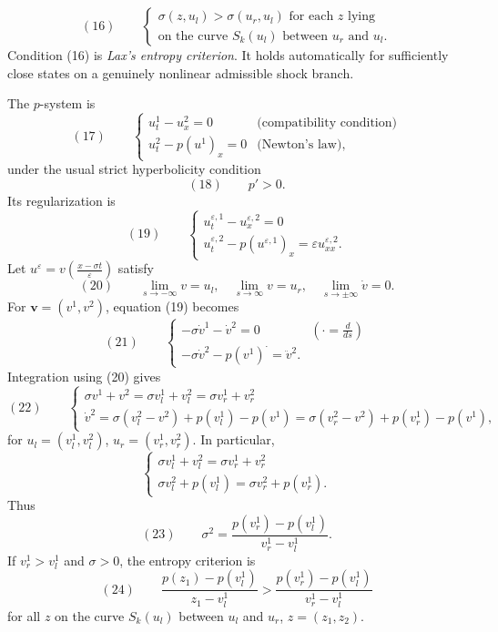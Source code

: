 \begin{definition}
\label{def:lax-entropy-criterion-general}
$$(16) \qquad \begin{cases} \sigma(z,u_l) > \sigma(u_r,u_l) \text{ for each } z \text{ lying} \\ \text{on the curve } S_k(u_l) \text{ between } u_r \text{ and } u_l. \end{cases}$$
Condition (16) is \textit{Lax's entropy criterion}. It holds automatically for sufficiently close states on a genuinely nonlinear admissible shock branch.
\end{definition}

\begin{example}
\label{ex:traveling-waves-p-system}
The $p$-system is
$$(17) \qquad \begin{cases} u^1_t - u^2_x = 0 & \text{(compatibility condition)} \\ u^2_t - p(u^1)_x = 0 & \text{(Newton's law)}, \end{cases}$$
under the usual strict hyperbolicity condition
$$(18) \qquad p' > 0.$$
Its regularization is
$$(19) \qquad \begin{cases} u^{\varepsilon,1}_t - u^{\varepsilon,2}_x = 0 \\ u^{\varepsilon,2}_t - p(u^{\varepsilon,1})_x = \varepsilon u^{\varepsilon,2}_{xx}. \end{cases}$$
Let $u^\varepsilon = v\left(\frac{x-\sigma t}{\varepsilon}\right)$ satisfy
$$(20) \qquad \lim_{s\to-\infty} v = u_l, \quad \lim_{s\to\infty} v = u_r, \quad \lim_{s\to\pm\infty} \dot v = 0.$$
For $\mathbf v=(v^1,v^2)$, equation (19) becomes
$$(21) \qquad \begin{cases} -\sigma\dot v^1 - \dot v^2 = 0 & \left(\cdot = \frac{d}{ds}\right) \\ -\sigma\dot v^2 - p(v^1)^\cdot = \ddot v^2. \end{cases}$$
Integration using (20) gives
$$(22) \qquad \begin{cases} \sigma v^1 + v^2 = \sigma v^1_l + v^2_l = \sigma v^1_r + v^2_r \\ \dot v^2 = \sigma(v^2_l-v^2) + p(v^1_l) - p(v^1) = \sigma(v^2_r-v^2) + p(v^1_r) - p(v^1), \end{cases}$$
for $u_l=(v^1_l,v^2_l)$, $u_r=(v^1_r,v^2_r)$. In particular,
$$\begin{cases} \sigma v^1_l + v^2_l = \sigma v^1_r + v^2_r \\ \sigma v^2_l + p(v^1_l) = \sigma v^2_r + p(v^1_r). \end{cases}$$
Thus
$$(23) \qquad \sigma^2 = \frac{p(v^1_r)-p(v^1_l)}{v^1_r - v^1_l}.$$
If $v^1_r>v^1_l$ and $\sigma>0$, the entropy criterion is
$$(24) \qquad \frac{p(z_1)-p(v^1_l)}{z_1-v^1_l} > \frac{p(v^1_r)-p(v^1_l)}{v^1_r-v^1_l}$$
for all $z$ on the curve $S_k(u_l)$ between $u_l$ and $u_r$, $z=(z_1,z_2)$.


\end{example}
